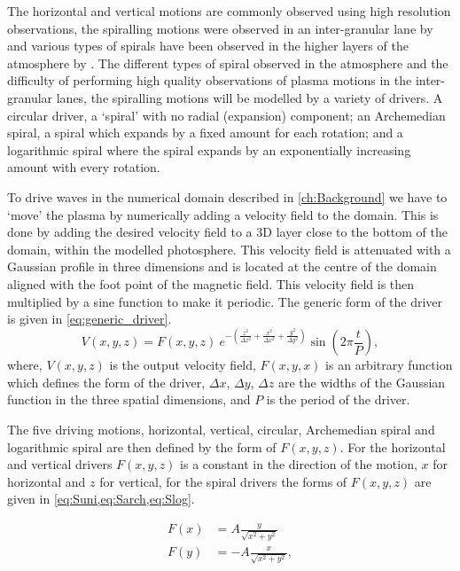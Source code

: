 The horizontal and vertical motions are commonly observed using high resolution observations, the spiralling motions were observed in an inter-granular lane by \cite{Bonet2008} and various types of spirals have been observed in the higher layers of the atmosphere by \cite{Wedemeyer-Bohm2009,Wedemeyer-Bohm2012,Wedemeyer2013}.
The different types of spiral observed in the atmosphere and the difficulty of performing high quality observations of plasma motions in the inter-granular lanes, the spiralling motions will be modelled by a variety of drivers.
A circular driver, a `spiral' with no radial (expansion) component; an Archemedian spiral, a spiral which expands by a fixed amount for each rotation; and a logarithmic spiral where the spiral expands by an exponentially increasing amount with every rotation.

To drive waves in the numerical domain described in \cref{ch:Background} we have to `move' the plasma by numerically adding a velocity field to the domain.
This is done by adding the desired velocity field to a 3D layer close to the bottom of the domain, within the modelled photosphere.
This velocity field is attenuated with a Gaussian profile in three dimensions and is located at the centre of the domain aligned with the foot point of the magnetic field.
This velocity field is then multiplied by a sine function to make it periodic. The generic form of the driver is given in \cref{eq:generic_driver}.
\begin{equation}
	V(x,y,z) = F(x,y,z) \ e^{-\left(\frac{z^2}{\Delta z^2} + \frac{x^2}{\Delta x^2} + \frac{y^2}{\Delta y^2}\right)} \sin \left(2\pi \frac{t}{P}\right),
	\label{eq:generic_driver}
\end{equation}
where, $V(x,y,z)$ is the output velocity field, $F(x,y,x)$ is an arbitrary function which defines the form of the driver, $\Delta x$, $\Delta y$, $\Delta z$ are the widths of the Gaussian function in the three spatial dimensions, and $P$ is the period of the driver.

The five driving motions, horizontal, vertical, circular, Archemedian spiral and logarithmic spiral are then defined by the form of $F(x,y,z)$. For the horizontal and vertical drivers $F(x,y,z)$ is a constant in the direction of the motion, $x$ for horizontal and $z$ for vertical, for the spiral drivers the forms of $F(x,y,z)$ are given in \cref{eq:Suni,eq:Sarch,eq:Slog}.

\begin{subequations}
	\begin{align}
		F(x) &= A \frac{y}{\sqrt{x^2 + y^2}}\\
		F(y) &= - A \frac{x}{\sqrt{x^2 + y^2}},
	\end{align}
	\label{eq:Suni}
\end{subequations}
 
